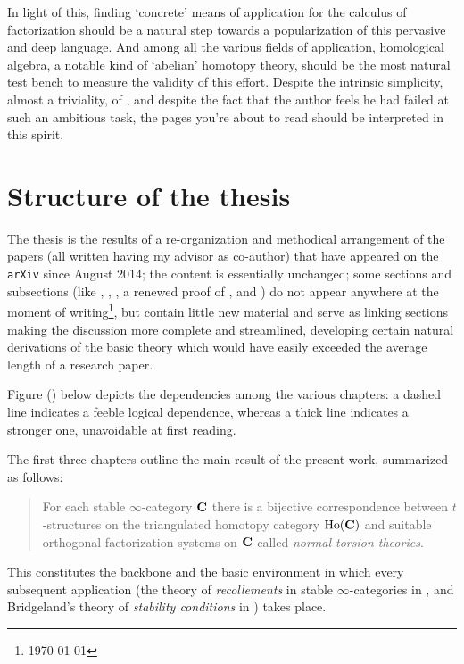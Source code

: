 In light of this, finding `concrete' means of application for the calculus of factorization should be a natural step towards a popularization of this pervasive and deep language. And among all the various fields of application, homological algebra, a notable kind of `abelian' homotopy theory, should be the most natural test bench to measure the validity of this effort. Despite the intrinsic simplicity, almost a triviality, of \athm {}, and despite the fact that the author feels he had failed at such an ambitious task, the pages you're about to read should be interpreted in this spirit.
\section*{Structure of the thesis}
The thesis is the results of a re\hyp{}organization and methodical arrangement of the papers \cite{FL0,heart,recol,infty-stab} (all written having my advisor as co\hyp{}author) that have appeared on the {\tt arXiv} since August 2014; the content is essentially unchanged; some sections and subsections (like \eg {}, , , a renewed proof of , and \achap {}) do not appear anywhere at the moment of writing\footnote{\today}, but contain little new material and serve as linking sections making the discussion more complete and streamlined, developing certain natural derivations of the basic theory which would have easily exceeded the average length of a research paper. 

Figure () below depicts the dependencies among the various chapters: a dashed line indicates a feeble logical dependence, whereas a thick line indicates a stronger one, unavoidable at first reading.

The first three chapters outline the main result of the present work, summarized as follows: 
\begin{quote}
For each stable $\infty$\hyp{}category $\textbf{C}$ there is a bijective correspondence between $t$\hyp{}structures on the triangulated homotopy category $\text{Ho}(\textbf{C})$ and suitable orthogonal factorization systems on $\textbf{C}$ called \emph{normal torsion theories}.
\end{quote}
This constitutes the backbone and the basic environment in which every subsequent application (the theory of \emph{recollements} in stable $\infty$\hyp{}categories in \achap {}, and Bridgeland's theory of \emph{stability conditions} in \achap {}) takes place.

